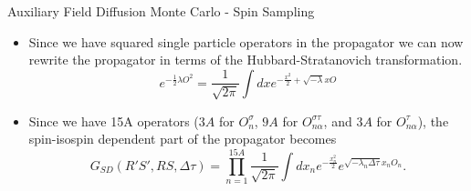 \documentclass{beamer}
\newcommand{\dt}{\Delta\tau}
\begin{document}
\begin{frame}{Auxiliary Field Diffusion Monte Carlo - Spin Sampling}
\begin{itemize}
   \item Since we have squared single particle operators in the propagator we can now rewrite the propagator in terms of the Hubbard-Stratanovich transformation.
   \begin{equation*}
      e^{-\frac{1}{2}\lambda O^2} = \frac{1}{\sqrt{2\pi}} \int dx e^{-\frac{x^2}{2} + \sqrt{-\lambda}xO}
   \end{equation*}
   \item Since we have 15A operators ($3A$ for $O_{n}^{\sigma}$, $9A$ for $O_{n\alpha}^{\sigma\tau}$, and $3A$ for $O_{n\alpha}^{\tau}$), the spin-isospin dependent part of the propagator becomes
   \begin{equation*}
      G_{SD}(R'S',RS,\dt) = \prod\limits_{n=1}^{15A}\frac{1}{\sqrt{2\pi}}\int dx_n e^{-\frac{x_n^2}{2}}e^{\sqrt{-\lambda_n\dt} x_nO_n}.
   \end{equation*}
\end{itemize}
\end{frame}
\end{document}
